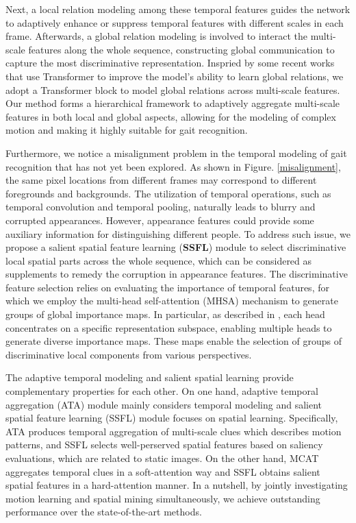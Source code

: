 \documentclass[journal]{IEEEtran}
\begin{document}
 Next, a local relation modeling among these temporal features guides the network to adaptively enhance or suppress temporal features with different scales in each frame. Afterwards, a global relation modeling is involved to interact the multi-scale features along the whole sequence, constructing global communication to capture the most discriminative representation. Inspried by some recent works \cite{zhang2021multi, chen2021crossvit, dosovitskiy2020image, liu2023transkeleton, zhu2022mlst} that use Transformer \cite{transformer} to improve the model's ability to learn global relations, we adopt a Transformer block to model global relations across multi-scale features. Our method forms a hierarchical framework to adaptively aggregate multi-scale features in both local and global aspects, allowing for the modeling of complex motion and making it highly suitable for gait recognition.

 Furthermore, we notice a misalignment problem in the temporal modeling of gait recognition that has not yet been explored. As shown in Figure. \ref{misalignment}, the same pixel locations from different frames may correspond to different foregrounds and backgrounds. The utilization of temporal operations, such as temporal convolution and temporal pooling, naturally leads to blurry and corrupted appearances. However, appearance features could provide some auxiliary information for distinguishing different people. To address such issue, we propose a salient spatial feature learning (\textbf{SSFL}) module to select discriminative local spatial parts across the whole sequence, which can be considered as supplements to remedy the corruption in appearance features. The discriminative feature selection relies on evaluating the importance of temporal features, for which we employ the multi-head self-attention (MHSA) mechanism to generate groups of global importance maps. In particular, as described in \cite{transformer}, each head concentrates on a specific representation subspace, enabling multiple heads to generate diverse importance maps. These maps enable the selection of groups of discriminative local components from various perspectives.
 
 The adaptive temporal modeling and salient spatial learning provide complementary properties for each other. On one hand, adaptive temporal aggregation (ATA) module mainly considers temporal modeling and salient spatial feature learning (SSFL) module focuses on spatial learning. Specifically, ATA produces temporal aggregation of multi-scale clues which describes motion patterns, and SSFL selects well-perserved spatial features based on saliency evaluations, which are related to static images. On the other hand, MCAT aggregates temporal clues in a soft-attention way and SSFL obtains salient spatial features in a hard-attention manner. In a nutshell, by jointly investigating motion learning and spatial mining simultaneously, we achieve outstanding performance over the state-of-the-art methods.
 
\end{document}
